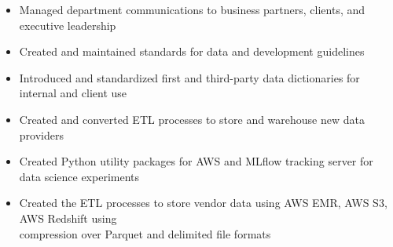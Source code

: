 
\ExperienceExpanded
{\begin{itemize}
    \item Managed department communications to business partners, clients, and executive leadership
    \item Created and maintained standards for data and development guidelines
    \item Introduced and standardized first and third-party data dictionaries for internal and
    client use
    \item Created and converted ETL processes to store and warehouse new data providers
    \item Created Python utility packages for AWS and MLflow tracking server for data science
    experiments
    \item Created the ETL processes to store vendor data using AWS EMR, AWS S3, AWS Redshift using
    \\compression over Parquet and delimited file formats
\end{itemize}}

\vspace*{0.05 in}

